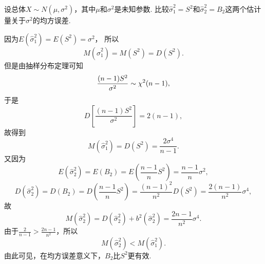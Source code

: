 \begin{example}
设总体\(X \sim N(\mu,\sigma^2)\)，其中\(\mu\)和\(\sigma^2\)是未知参数.
比较\(\hat\sigma_1^2=S^2\)和\(\hat\sigma_2^2=B_2\)这两个估计量关于\(\sigma^2\)的均方误差.
\begin{solution}
因为\(E(\hat{\sigma}_1^2)
= E(S^2)
= \sigma^2\)，
所以\begin{equation*}
	M(\hat{\sigma}_1^2)
	= M(S^2)
	= D(S^2).
\end{equation*}
但是由抽样分布定理可知\begin{equation*}
	\frac{(n-1) S^2}{\sigma^2}
	\sim
	\chi^2(n-1),
\end{equation*}
于是\begin{equation*}
	D\left[\frac{(n-1) S^2}{\sigma^2}\right]
	= 2(n-1),
\end{equation*}
故得到\begin{equation*}
	M(\hat{\sigma}_1^2)
	= D(S^2)
	= \frac{2\sigma^4}{n-1}.
\end{equation*}
又因为\begin{equation*}
	E(\hat{\sigma}_2^2)
	= E(B_2)
	= E\left(\frac{n-1}{n} S^2\right)
	= \frac{n-1}{n} \sigma^2,
\end{equation*}\begin{equation*}
	D(\hat{\sigma}_2^2)
	= D(B_2)
	= D\left(\frac{n-1}{n} S^2\right)
	= \frac{(n-1)^2}{n^2} D(S^2)
	= \frac{2(n-1)}{n^2} \sigma^4,
\end{equation*}
故\begin{equation*}
	M(\hat{\sigma}_2^2)
	= D(\hat{\sigma}_2^2) + b^2(\hat{\sigma}_2^2)
	= \frac{2n-1}{n^2} \sigma^4.
\end{equation*}
由于\(\frac{2}{n-1} > \frac{2n-1}{n^2}\)，所以\begin{equation*}
	M(\hat{\sigma}_2^2) < M(\hat{\sigma}_1^2).
\end{equation*}
由此可见，在均方误差意义下，\(B_2\)比\(S^2\)更有效.
\end{solution}
\end{example}

